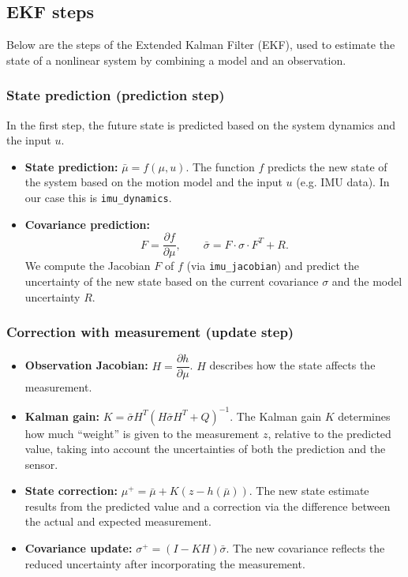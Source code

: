 \documentclass[11pt]{article}
\begin{document}
\subsection{EKF steps}
Below are the steps of the Extended Kalman Filter (EKF), used to estimate the state of a nonlinear
system by combining a model and an observation.

\subsubsection{State prediction (prediction step)}
In the first step, the future state is predicted based on the system dynamics and the input $u$.
\begin{itemize}[leftmargin=*]
  \item \textbf{State prediction:} $\bar\mu = f(\mu,u)$. The function $f$ predicts the new state of the
  system based on the motion model and the input $u$ (e.g. IMU data). In our case this is
  \texttt{imu\_dynamics}.
  \item \textbf{Covariance prediction:}
  \[
  F = \frac{\partial f}{\partial \mu}, \qquad \bar\sigma = F\cdot\sigma\cdot F^T + R.
  \]
  We compute the Jacobian $F$ of $f$ (via \texttt{imu\_jacobian}) and predict the uncertainty of the
  new state based on the current covariance $\sigma$ and the model uncertainty $R$.
\end{itemize}

\subsubsection{Correction with measurement (update step)}
\begin{itemize}[leftmargin=*]
  \item \textbf{Observation Jacobian:} $H = \dfrac{\partial h}{\partial \mu}$. $H$ describes how the
  state affects the measurement.
  \item \textbf{Kalman gain:} $K = \bar\sigma H^T(H\bar\sigma H^T+Q)^{-1}$. The Kalman gain $K$
  determines how much ``weight'' is given to the measurement $z$, relative to the predicted value,
  taking into account the uncertainties of both the prediction and the sensor.
  \item \textbf{State correction:} $\mu^+ = \bar\mu + K(z-h(\bar\mu))$. The new state estimate results
  from the predicted value and a correction via the difference between the actual and expected
  measurement.
  \item \textbf{Covariance update:} $\sigma^+ = (I-KH)\bar\sigma$. The new covariance reflects the
  reduced uncertainty after incorporating the measurement.
\end{itemize}
\end{document}
